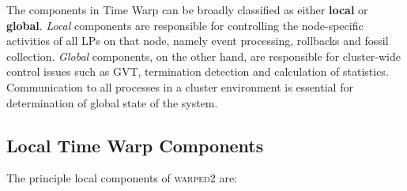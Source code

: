 \documentclass[11pt]{book}
\begin{document}
The components in Time Warp can be broadly classified as either \textbf{local} or
\textbf{global}. \emph{Local} components are responsible for controlling the node-specific
activities of all LPs on that node, namely event processing, rollbacks and fossil collection.
\emph{Global} components, on the other hand, are responsible for cluster-wide control
issues such as GVT, termination detection and calculation of statistics.  Communication to all
processes in a cluster environment is essential for determination of global state of the
system.

\subsection{Local Time Warp Components}\label{subsec:local_comporents}

The principle local components of \textsc{warped2} are:
\end{document}
